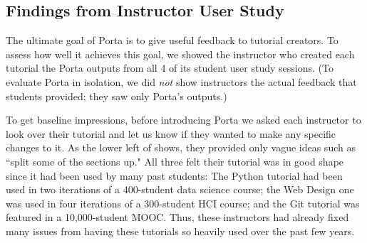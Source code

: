 \subsection{Findings from Instructor User Study}

The ultimate goal of Porta is to give useful feedback to tutorial
creators. To assess how well it achieves this goal, we showed the
instructor who created each tutorial the Porta outputs from all 4 of its
student user study sessions. (To evaluate Porta in isolation, we did
\emph{not} show instructors the actual feedback that students provided;
they saw only Porta's outputs.)


To get baseline impressions, before introducing Porta we asked each
instructor to look over their tutorial and let us know if they wanted to
make any specific changes to it. As the lower left of
 shows, they provided only vague ideas such as
``split some of the sections up." All three felt their tutorial was in
good shape since it had been used by many past students: The Python
tutorial had been used in two iterations of a 400-student data science
course; the Web Design one was used in four iterations of a 300-student
HCI course; and the Git tutorial was featured in a 10,000-student
MOOC. Thus, these instructors had already fixed many issues
from having these tutorials so heavily used over the past few years.

